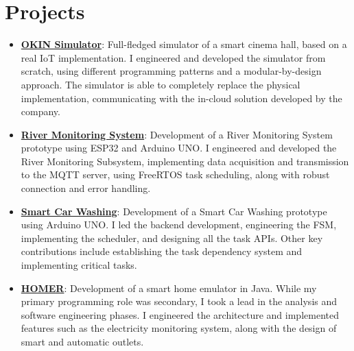 \documentclass[letterpaper,11pt]{article}
\newcommand{\resumeItem}[2]{
  \item\small{
    \textbf{#1}{: #2 \vspace{-2pt}}
  }
}
\newcommand{\resumeSubItem}[2]{\resumeItem{#1}{#2}\vspace{-4pt}}
\newcommand{\resumeSubHeadingListStart}{\begin{itemize}[leftmargin=*]}
\newcommand{\resumeSubHeadingListEnd}{\end{itemize}}
\begin{document}
\section{Projects}
  \resumeSubHeadingListStart
  \resumeSubItem{\href{https://github.com/aleemont1/OKINsimulator}{OKIN Simulator}}
      {Full-fledged simulator of a smart cinema hall, based on a real IoT implementation.
       I engineered and developed the simulator from scratch, using different programming patterns and a modular-by-design approach.
       The simulator is able to completely replace the physical implementation, communicating with the in-cloud solution developed 
       by the company.}
    \resumeSubItem{\href{https://github.com/aleemont1/esiot-23-24-assignment3/}{River Monitoring System}}
      {Development of a River Monitoring System prototype using ESP32 and Arduino UNO.
       I engineered and developed the River Monitoring Subsystem, implementing data acquisition and
       transmission to the MQTT server, using FreeRTOS task scheduling, along with robust connection and error handling.}
    \resumeSubItem{\href{https://github.com/aleemont1/esiot-23-24-assignment2/}{Smart Car Washing}}
      {Development of a Smart Car Washing prototype using Arduino UNO. 
      I led the backend development, engineering the FSM, implementing the scheduler, and designing all the task APIs. 
      Other key contributions include establishing the task dependency system and implementing critical tasks.}
    \resumeSubItem{\href{https://github.com/progetto-oop-22-23/OOP22-HOMER}{HOMER}}
      {Development of a smart home emulator in Java. 
        While my primary programming role was secondary, I took a lead in the analysis and software engineering phases. 
        I engineered the architecture and implemented features such as the electricity monitoring system, 
        along with the design of smart and automatic outlets.}
  \resumeSubHeadingListEnd

\end{document}
